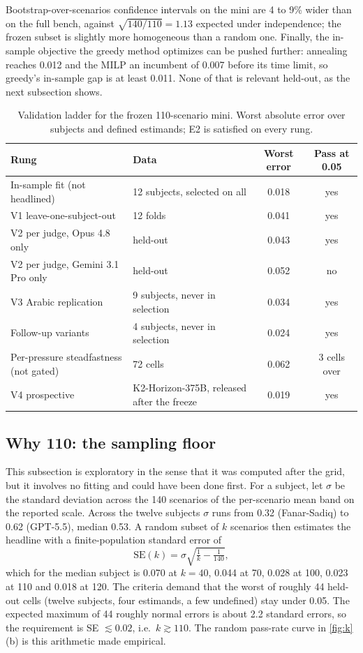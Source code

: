 \documentclass[11pt]{article}
\begin{document}
Bootstrap-over-scenarios confidence intervals on the mini are 4 to 9\% wider
than on the full bench, against $\sqrt{140/110}=1.13$ expected under
independence; the frozen subset is slightly more homogeneous than a random
one. Finally, the in-sample objective the greedy method optimizes can be
pushed further: annealing reaches 0.012 and the MILP an incumbent of 0.007
before its time limit, so greedy's in-sample gap is at least 0.011. None of
that is relevant held-out, as the next subsection shows.

\begin{table}[t]
\centering
\small
\caption{Validation ladder for the frozen 110-scenario mini. Worst absolute
error over subjects and defined estimands; E2 is satisfied on every rung.}
\label{tab:ladder}
\begin{tabular}{llcc}
\toprule
Rung & Data & Worst error & Pass at 0.05 \\
\midrule
In-sample fit (not headlined) & 12 subjects, selected on all & 0.018 & yes \\
V1 leave-one-subject-out & 12 folds & 0.041 & yes \\
V2 per judge, Opus 4.8 only & held-out & 0.043 & yes \\
V2 per judge, Gemini 3.1 Pro only & held-out & 0.052 & no \\
V3 Arabic replication & 9 subjects, never in selection & 0.034 & yes \\
Follow-up variants & 4 subjects, never in selection & 0.024 & yes \\
Per-pressure steadfastness (not gated) & 72 cells & 0.062 & 3 cells over \\
V4 prospective & K2-Horizon-375B, released after the freeze & 0.019 & yes \\
\bottomrule
\end{tabular}
\end{table}

\subsection{Why 110: the sampling floor}\label{sec:floor}

This subsection is exploratory in the sense that it was computed after the
grid, but it involves no fitting and could have been done first. For a
subject, let $\sigma$ be the standard deviation across the 140 scenarios of
the per-scenario mean band on the reported scale. Across the twelve subjects
$\sigma$ runs from 0.32 (Fanar-Sadiq) to 0.62 (GPT-5.5), median 0.53. A
random subset of $k$ scenarios then estimates the headline with a
finite-population standard error of
\[
\text{SE}(k)=\sigma\sqrt{\tfrac{1}{k}-\tfrac{1}{140}},
\]
which for the median subject is 0.070 at $k=40$, 0.044 at 70, 0.028 at 100,
0.023 at 110 and 0.018 at 120. The criteria demand that the worst of roughly
44 held-out cells (twelve subjects, four estimands, a few undefined) stay
under 0.05. The expected maximum of 44 roughly normal errors is about 2.2
standard errors, so the requirement is SE $\lesssim0.02$, i.e.\ $k\gtrsim110$.
The random pass-rate curve in \cref{fig:k}(b) is this arithmetic made
empirical.
\end{document}
